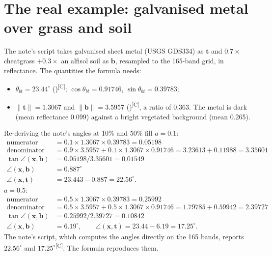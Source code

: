 \documentclass[11pt,a4paper,oneside,openany]{book}
\newcommand{\B}[1]{{\symbf{#1}}}
\newcommand{\B}[1]{{\bm{#1}}}
\newcommand{\comp}{\textsuperscript{\textsf{\scriptsize[C]}}}
\newcommand{\nrm}[1]{\lVert #1\rVert}
\newcommand{\vx}{\B{x}}
\newcommand{\vt}{\B{t}}
\newcommand{\vb}{\B{b}}
\begin{document}
\section{The real example: galvanised metal over grass and soil}

The note's script takes galvanised sheet metal (USGS GDS334) as $\vt$ and $0.7\times$ cheatgrass $+0.3\times$ an alfisol soil as $\vb$, resampled to the
165-band grid, in reflectance. The quantities the formula needs:
\begin{itemize}
\item $\theta_{bt}=23.44^\circ$ ()\comp; $\cos\theta_{bt}=0.91746$, $\sin\theta_{bt}=0.39783$;
\item $\nrm{\vt}=1.3067$ and $\nrm{\vb}=3.5957$ ()\comp, a ratio of $0.363$. The metal is dark (mean reflectance
  0.099) against a bright vegetated background (mean 0.265).
\end{itemize}

\begin{worked}[label=we:samreal]{Re-deriving the note's angles at 10\% and 50\% fill}
$a=0.1$:
\begin{align*}
\text{numerator} &= 0.1\times1.3067\times0.39783=0.05198\\
\text{denominator} &= 0.9\times3.5957+0.1\times1.3067\times0.91746=3.23613+0.11988=3.35601\\
\tan\angle(\vx,\vb) &= 0.05198/3.35601=0.01549\\
\angle(\vx,\vb) &= 0.887^\circ\\
\angle(\vx,\vt) &= 23.443-0.887=22.56^\circ .
\end{align*}
$a=0.5$:
\begin{align*}
\text{numerator} &= 0.5\times1.3067\times0.39783=0.25992\\
\text{denominator} &= 0.5\times3.5957+0.5\times1.3067\times0.91746=1.79785+0.59942=2.39727\\
\tan\angle(\vx,\vb) &= 0.25992/2.39727=0.10842\\
\angle(\vx,\vb) &= 6.19^\circ,\qquad \angle(\vx,\vt)=23.44-6.19=17.25^\circ .
\end{align*}
The note's script, which computes the angles directly on the 165 bands, reports $22.56^\circ$ and $17.25^\circ$\comp. The formula reproduces them.
\end{worked}
\end{document}
